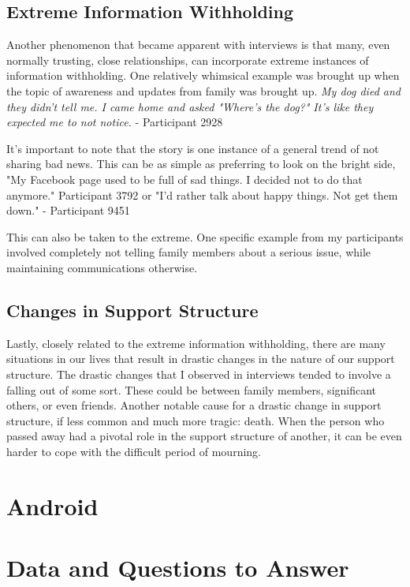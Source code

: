   \subsection{Extreme Information Withholding}
  Another phenomenon that became apparent with interviews is that
  many, even normally trusting, close relationships,
  can incorporate extreme instances of information withholding.
  One relatively whimsical example was brought up
  when the topic of awareness and updates from family was brought up.
  \textit{
    My dog died and they didn't tell me.
    I came home and asked "Where's the dog?"
    It's like they expected me to not notice.
  } - Participant 2928

  It's important to note that the story is one instance of a general
  trend of not sharing bad news.
  This can be as simple as preferring to look on the bright side,
  "My Facebook page used to be full of sad things.
  I decided not to do that anymore." Participant 3792
  or "I'd rather talk about happy things. Not get them down."
  - Participant 9451
  
  This can also be taken to the extreme.
  One specific example from my participants involved
  completely not telling family members about a serious issue,
  while maintaining communications otherwise.

  \subsection{Changes in Support Structure}
  Lastly, closely related to the extreme information withholding,
  there are many situations in our lives that result in
  drastic changes in the nature of our support structure.
  The drastic changes that I observed in interviews
  tended to involve a falling out of some sort.
  These could be between family members,
  significant others, or even friends.
  Another notable cause for a drastic change in support structure,
  if less common and much more tragic: death.
  When the person who passed away had a pivotal role in the support
  structure of another, it can be even harder to cope with
  the difficult period of mourning.

\section{Android}
\label{sec:Android}

\section{Data and Questions to Answer}

